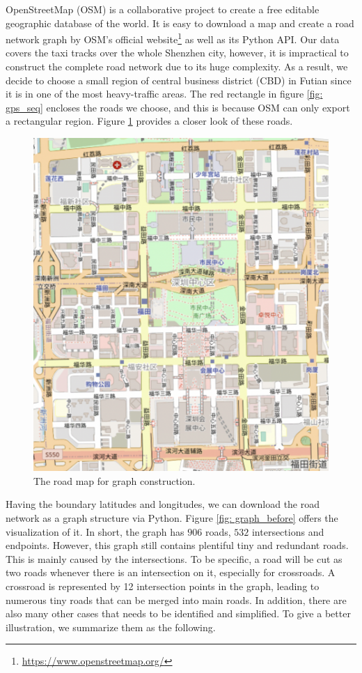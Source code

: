 OpenStreetMap (OSM)\cite{osm} is a collaborative project to create a free editable geographic database of the world. It is easy to download a map and create a road network graph by OSM's official website\footnote{\href{https://www.openstreetmap.org/}{https://www.openstreetmap.org/}} as well as its Python API. Our data covers the taxi tracks over the whole Shenzhen city, however, it is impractical to construct the complete road network due to its huge complexity. As a result, we decide to choose a small region of central business district (CBD) in Futian since it is in one of the most heavy-traffic areas. The red rectangle in figure \ref{fig: gps_seq} encloses the roads we choose, and this is because OSM can only export a rectangular region. Figure \ref{fig: roadmap} provides a closer look of these roads.
\begin{figure}[htb]
  \centering
  \includegraphics[width=\textwidth]{images/roadmap.png}
  \caption{The road map for graph construction.}
  \label{fig: roadmap}
\end{figure}

Having the boundary latitudes and longitudes, we can download the road network as a graph structure via Python. Figure \ref{fig: graph_before} offers the visualization of it. In short, the graph has $906$ roads, $532$ intersections and endpoints. However, this graph still contains plentiful tiny and redundant roads. This is mainly caused by the intersections\cite{graph_simplify}. To be specific, a road will be cut as two roads whenever there is an intersection on it, especially for crossroads. A crossroad is represented by 12 intersection points in the graph, leading to numerous tiny roads that can be merged into main roads. In addition, there are also many other cases that needs to be identified and simplified. To give a better illustration, we summarize them as the following.

